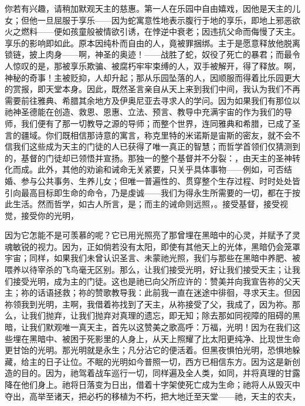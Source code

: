 你若有兴趣，请稍加默观天主的慈惠。第一人在乐园中自由嬉戏，因他是天主的儿女；但他一旦屈服于享乐——因为蛇寓意性地表示腹行于地的享乐，即地上邪恶欲火之燃料——便如孩童般被情欲引诱，在悖逆中衰老；因违抗父命而侮慢了天主。享乐的影响即如此。原本因纯朴而自由的人，竟被罪捆绑。主于是愿意释放他脱离锁链，披上肉身——啊，神圣的奥迹！——战胜了蛇，奴役了死亡的暴君；而最令人惊叹的是，那被享乐欺骗、被腐朽牢牢束缚的人，双手被解开，得了释放。啊，神秘的奇事！主被贬抑，人却升起；那从乐园坠落的人，因顺服而得着比乐园更大的赏报，即天堂本身。因此，既然圣言亲自从天上来到我们中间，我认为我们不再需要前往雅典、希腊其余地方及伊奥尼亚去寻求人的学问。因为如果我们有那位以祂神圣德能在创造、救恩、恩惠、立法、预言、教导中充满宇宙的作为我们的导师，我们便有了那一切教导之源的导师；而整个世界，连同雅典和希腊，已成了圣言的疆域。你们既相信那诗意的寓言，称克里特的米诺斯是宙斯的密友，就不会不信我们这些成为天主的门徒的人已获得了唯一真正的智慧；而哲学首领们仅猜测到的，基督的门徒却已领悟并宣扬。那独一的整个基督并不分裂：，由天主的圣神转化而成。此外，其他的劝谕和诫命无关紧要，只关乎具体事物——例如，可否结婚、参与公共事务、生养儿女；但唯一普遍性的、贯穿整个生存过程、时时处处皆引向最高目标即生命的命令，乃是虔诚——我们为得永生所需要的一切，都在于按此生活。然而哲学，如古人所言，是；而主的诫命则远照，。接受基督，接受视觉，接受你的光明，\par

\par

因为它怎能不是可羡慕的呢？它已用光照亮了那曾埋在黑暗中的心灵，并赋予了灵魂敏锐的视力。因为，正如倘若没有太阳，即使有其他天上的光体，黑暗仍会笼罩宇宙；同样，如果我们未曾认识圣言、未蒙祂光照，我们与那些在黑暗中养肥、被喂养以待宰杀的飞鸟毫无区别。那么，让我们接受光明，好让我们接受天主；让我们接受光明，成为主的门徒。这也是祂已向父所应许的：赞美并向我宣告祢的父天主；祢的话语拯救；祢的赞歌教导我：此前我一直在迷途中徘徊，寻求天主。但因祢领我到光明，主啊，我借着祢找到了天主，从祢接受了父，我成了，因为祢。那么，让我们抛弃，让我们抛弃对真理的遗忘，即无知；除去那如同视障的阻碍的黑暗，让我们默观唯一真天主，首先以这赞美之歌高呼：万福，光明！因为在我们这些埋在黑暗中、被困于死影里的人身上，从天上照耀了比太阳更纯净、比现世生命更甘饴的光明。那光明就是永生；凡分沾它的便活着。但黑夜惧怕光明，恐惧地躲藏，给主的日子让位。不眠的光明如今普照一切，西方已相信东方。因为这是新创造的目的。因为，祂驾着战车巡行一切，同样遍及全人类，如同，并将真理的甘露降在他们身上。祂将日落变为日出，借着十字架使死亡成为生命；祂将人从毁灭中夺出，高举至诸天，把必朽的移植为不朽，把大地迁至天堂——祂，天主的农夫，\par

